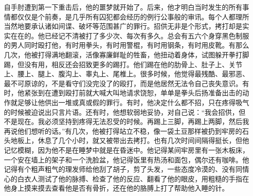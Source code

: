 \begin{paracol}{2}
\switchcolumn

自手肘遭到第一下重击后，他的噩梦就开始了。后来，他才明白当时发生的所有事情都仅仅是个前奏，是几乎所有囚犯都会经历的例行公事般的审讯。每个人都理所当然地要承认诸如间谍、破坏等范围甚广的罪行。招供无非是个形式，拷打却是实实在在的。他已经记不清被打了多少次、每次有多久。总会有五六个身穿黑色制服的男人同时殴打他，有时用拳头，有时用警棍，有时用钢条，有时用皮靴。有那么几次，他被打得满地翻滚，活像寡廉鲜耻的牲畜，他扭动着身体，试图躲开拳打脚踢，但没有用，相反还会招致更多的踢打。他们踢在他的肋骨上、肚子上、关节上、腰上、腿上、腹沟上、睾丸上、尾椎上。很多时候，他觉得最残酷、最邪恶、最不可原谅的，不是看守们没完没了的殴打，而是他居然无法令自己丧失意识。有时，他紧张到在遭到殴打前就大喊大叫地请求饶恕，单单是拳头后扬准备出击的动作就足够让他供出一堆或真或假的罪行。有时，他决定什么都不招，只在疼得吸气的时候被迫说出只言片语。还有时，他想软弱地妥协，对自己说：``我会招供，但不是现在。我必须坚持到疼得无法忍受的时候。再踢上三脚，再踢上两脚，然后我再说他们想听的话。''有几次，他被打得站立不稳，像一袋土豆那样被扔到牢房的石头地板上，休息了几个小时，就又被带出去拷打。也有几次时间间隔得挺长，但他记忆模糊，因为他不是在睡梦中就是在昏迷中。他记得某间牢房里有一张木板床，一个安在墙上的架子和一个洗脸盆，他记得饭里有热汤和面包，偶尔还有咖啡。他记得有个粗声粗气的理发师给他刮了胡子，剪了头发，一些态度冷漠的、没有同情心的白衣人测试了他的脉搏、检查了他的反应、翻看了他的眼皮，用粗糙的手指在他身上摸来摸去查看他是否有骨折，还在他的胳膊上打了帮助他入睡的针。

\switchcolumn*


\end{paracol}
